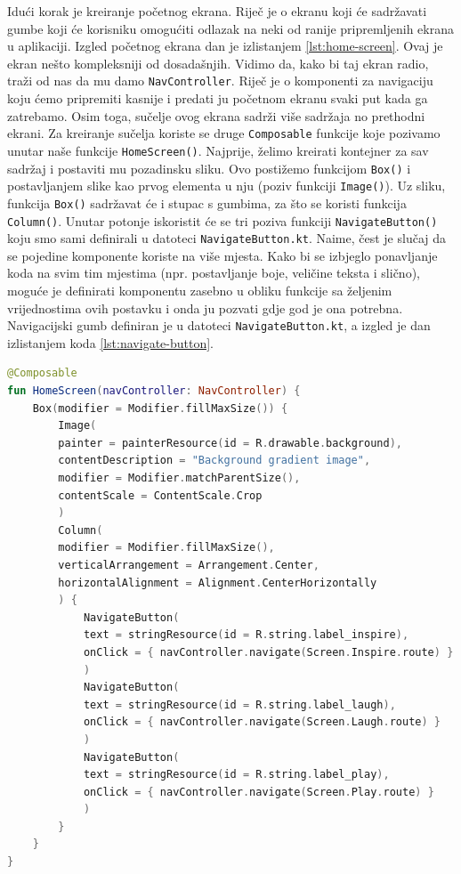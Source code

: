 \documentclass[11pt,a4paper,twoside]{article}
\begin{document}
Idući korak je kreiranje početnog ekrana. Riječ je o ekranu koji će sadržavati gumbe koji će korisniku omogućiti odlazak na neki od ranije pripremljenih ekrana u aplikaciji. Izgled početnog ekrana dan je izlistanjem \ref{lst:home-screen}. Ovaj je ekran nešto kompleksniji od dosadašnjih. Vidimo da, kako bi taj ekran radio, traži od nas da mu damo \texttt{NavController}. Riječ je o komponenti za navigaciju koju ćemo pripremiti kasnije i predati ju početnom ekranu svaki put kada ga zatrebamo. Osim toga, sučelje ovog ekrana sadrži više sadržaja no prethodni ekrani. Za kreiranje sučelja koriste se druge \texttt{Composable} funkcije koje pozivamo unutar naše funkcije \texttt{HomeScreen()}. Najprije, želimo kreirati kontejner za sav sadržaj i postaviti mu pozadinsku sliku. Ovo postižemo funkcijom \texttt{Box()} i postavljanjem slike kao prvog elementa u nju (poziv funkciji \texttt{Image()}). Uz sliku, funkcija \texttt{Box()} sadržavat će i stupac s gumbima, za što se koristi funkcija \texttt{Column()}. Unutar potonje iskoristit će se tri poziva funkciji \texttt{NavigateButton()} koju smo sami definirali u datoteci \texttt{NavigateButton.kt}. Naime, čest je slučaj da se pojedine komponente koriste na više mjesta. Kako bi se izbjeglo ponavljanje koda na svim tim mjestima (npr. postavljanje boje, veličine teksta i slično), moguće je definirati komponentu zasebno u obliku funkcije sa željenim vrijednostima ovih postavku i onda ju pozvati gdje god je ona potrebna. Navigacijski gumb definiran je u datoteci \texttt{NavigateButton.kt}, a izgled je dan izlistanjem koda \ref{lst:navigate-button}.

\begin{lstlisting}[caption={Početni ekran - HomeScreen.kt}, label={lst:screen-home}, language=Kotlin]
@Composable
fun HomeScreen(navController: NavController) {
	Box(modifier = Modifier.fillMaxSize()) {
		Image(
		painter = painterResource(id = R.drawable.background),
		contentDescription = "Background gradient image",
		modifier = Modifier.matchParentSize(),
		contentScale = ContentScale.Crop
		)
		Column(
		modifier = Modifier.fillMaxSize(),
		verticalArrangement = Arrangement.Center,
		horizontalAlignment = Alignment.CenterHorizontally		
		) {
			NavigateButton(
			text = stringResource(id = R.string.label_inspire),
			onClick = { navController.navigate(Screen.Inspire.route) }
			)
			NavigateButton(
			text = stringResource(id = R.string.label_laugh),
			onClick = { navController.navigate(Screen.Laugh.route) }
			)
			NavigateButton(
			text = stringResource(id = R.string.label_play),
			onClick = { navController.navigate(Screen.Play.route) }
			)
		}
	}
}
\end{lstlisting}
\end{document}
